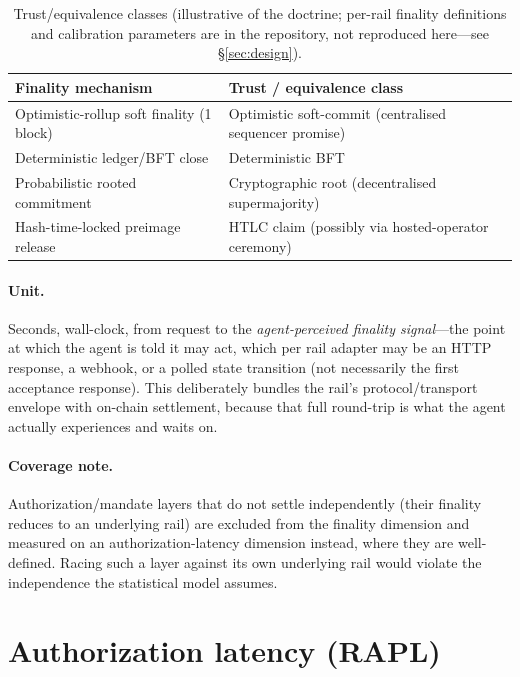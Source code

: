 \documentclass[11pt]{article}
\begin{document}
\begin{table}[t]
\centering
\caption{Trust/equivalence classes (illustrative of the doctrine; per-rail finality definitions and
calibration parameters are in the repository, not reproduced here---see \S\ref{sec:design}).}
\label{tab:trust}
\begin{tabular}{ll}
\toprule
Finality mechanism & Trust / equivalence class \\
\midrule
Optimistic-rollup soft finality (1 block) & Optimistic soft-commit (centralised sequencer promise) \\
Deterministic ledger/BFT close & Deterministic BFT \\
Probabilistic rooted commitment & Cryptographic root (decentralised supermajority) \\
Hash-time-locked preimage release & HTLC claim (possibly via hosted-operator ceremony) \\
\bottomrule
\end{tabular}
\end{table}

\paragraph{Unit.} Seconds, wall-clock, from request to the \emph{agent-perceived finality signal}---the
point at which the agent is told it may act, which per rail adapter may be an HTTP response, a webhook,
or a polled state transition (not necessarily the first acceptance response). This deliberately bundles
the rail's protocol/transport envelope with on-chain settlement, because that full round-trip is what
the agent actually experiences and waits on.

\paragraph{Coverage note.} Authorization/mandate layers that do not settle independently (their finality
reduces to an underlying rail) are excluded from the finality dimension and measured on an
authorization-latency dimension instead, where they are well-defined. Racing such a layer against its
own underlying rail would violate the independence the statistical model assumes.

\section{Authorization latency (RAPL)}\label{sec:rapl}
\end{document}

